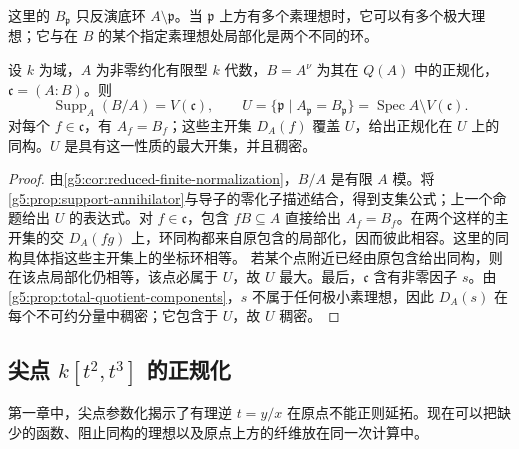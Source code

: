 这里的 \(B_{\mathfrak p}\) 只反演底环 \(A\setminus\mathfrak p\)。当 \(\mathfrak p\) 上方有多个素理想时，它可以有多个极大理想；它与在 \(B\) 的某个指定素理想处局部化是两个不同的环。

\begin{corollary}\label{g5:cor:normalization-isomorphism-locus}
	设 \(k\) 为域，\(A\) 为非零约化有限型 \(k\) 代数，\(B=A^\nu\) 为其在 \(Q(A)\) 中的正规化，\(\mathfrak c=(A:B)\)。则
	\[
	\operatorname{Supp}_A(B/A)=V(\mathfrak c),
	\qquad
	U=\{\mathfrak p\mid A_{\mathfrak p}=B_{\mathfrak p}\}
	=\operatorname{Spec}A\setminus V(\mathfrak c).
	\]
	对每个 \(f\in\mathfrak c\)，有 \(A_f=B_f\)；这些主开集 \(D_A(f)\) 覆盖 \(U\)，给出正规化在 \(U\) 上的同构。\(U\) 是具有这一性质的最大开集，并且稠密。
\end{corollary}
\begin{proof}
	由\cref{g5:cor:reduced-finite-normalization}，\(B/A\) 是有限 \(A\) 模。将\cref{g5:prop:support-annihilator}与导子的零化子描述结合，得到支集公式；上一个命题给出 \(U\) 的表达式。对 \(f\in\mathfrak c\)，包含 \(fB\subseteq A\) 直接给出 \(A_f=B_f\)。在两个这样的主开集的交 \(D_A(fg)\) 上，环同构都来自原包含的局部化，因而彼此相容。这里的同构具体指这些主开集上的坐标环相等。
	若某个点附近已经由原包含给出同构，则在该点局部化仍相等，该点必属于 \(U\)，故 \(U\) 最大。最后，\(\mathfrak c\) 含有非零因子 \(s\)。由\cref{g5:prop:total-quotient-components}，\(s\) 不属于任何极小素理想，因此 \(D_A(s)\) 在每个不可约分量中稠密；它包含于 \(U\)，故 \(U\) 稠密。
\end{proof}

\subsection{\texorpdfstring{尖点 \(k[t^2,t^3]\) 的正规化}{尖点 k[t²,t³] 的正规化}}
\label{g5:subsec:0403:02}

第一章中，尖点参数化揭示了有理逆 \(t=y/x\) 在原点不能正则延拓。现在可以把缺少的函数、阻止同构的理想以及原点上方的纤维放在同一次计算中。

